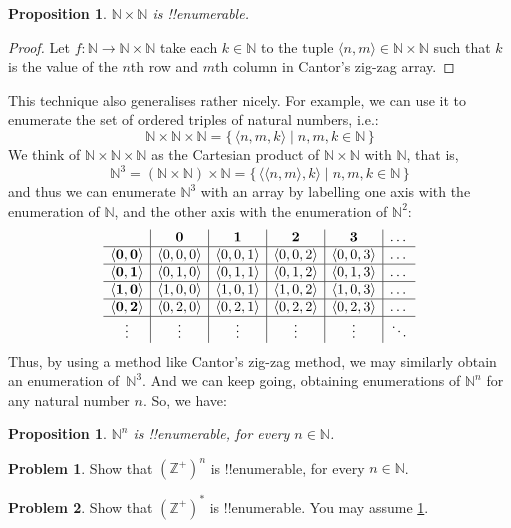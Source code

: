 \documentclass[10pt,a4paper]{article}
\theoremstyle{plain}
\newtheorem{prop}[thm]{Proposition}
\theoremstyle{definition}
\newtheorem{prob}{Problem}[section]
\theoremstyle{remark}
\newenvironment{explain}{}{}
\newcommand*{\ollabel}[1]{\label{#1}}
\providecommand{\tuple}[1]{\langle #1 \rangle}
\providecommand{\Nat}{\ensuremath{\mathbb{N}}}
\providecommand{\PosInt}{\mathbb{Z}^{+}}
\providecommand{\Setabs}[2]{\{\, #1 \mid #2 \,\}}
\providecommand{\cref}[1]{\ref{#1}}
\begin{document}
\begin{prop}\ollabel{natsquaredenumerable}
$\Nat \times \Nat$ is !!{enumerable}.
\end{prop}

\begin{proof}
Let $f \colon \Nat \to \Nat\times\Nat$ take each $k \in \Nat$ to the
tuple $\tuple{n,m} \in \Nat \times \Nat$ such that $k$ is the value of
the $n$th row and $m$th column in Cantor's zig-zag array. 
\end{proof}

\begin{explain}
This technique also generalises rather nicely. For example, we can use
it to enumerate the set of ordered triples of natural numbers, i.e.:
\[
\Nat \times \Nat \times \Nat = \Setabs{\tuple{n,m,k}}{n,m,k \in \Nat}
\]
We think of $\Nat \times \Nat \times \Nat$ as the Cartesian
product of $\Nat \times \Nat$ with $\Nat$, that is,
\[
\Nat^3 = (\Nat \times \Nat) \times \Nat =
\Setabs{\tuple{\tuple{n,m},k}}{n, m, k
  \in \Nat }
\]
and thus we can enumerate $\Nat^3$ with an array by labelling one
axis with the enumeration of $\Nat$, and the other axis with the
enumeration of $\Nat^2$:
\[
\begin{array}{ c | c | c | c | c | c}
& \mathbf 0 & \mathbf 1 & \mathbf 2 & \mathbf 3 & \dots \\
\hline
\mathbf{\tuple{0,0}} & \tuple{0,0,0} & \tuple{0,0,1} & \tuple{0,0,2} & \tuple{0,0,3} & \dots \\
\hline
\mathbf{\tuple{0,1}} & \tuple{0,1,0} & \tuple{0,1,1} & \tuple{0,1,2} & \tuple{0,1,3} & \dots \\
\hline
\mathbf{\tuple{1,0}} & \tuple{1,0,0} & \tuple{1,0,1} & \tuple{1,0,2} & \tuple{1,0,3} & \dots \\
\hline
\mathbf{\tuple{0,2}} & \tuple{0,2,0} & \tuple{0,2,1} & \tuple{0,2,2} & \tuple{0,2,3} & \dots\\
\hline
\vdots & \vdots & \vdots & \vdots & \vdots & \ddots \\
\end{array}
\]
Thus, by using a method like Cantor's zig-zag method, we may similarly
obtain an enumeration of~$\Nat^3$. And we can keep going, obtaining
enumerations of $\Nat^n$ for any natural number $n$. So, we have:
\end{explain}

\begin{prop}
$\Nat^n$ is !!{enumerable}, for every $n \in \Nat$.
\end{prop}

\begin{prob}\label{sfr:siz:zigzag:prob:posint-n}
Show that $(\PosInt)^n$ is !!{enumerable}, for every $n \in \Nat$.
\end{prob}

\begin{prob}\label{sfr:siz:zigzag:prob:posint-star}
  Show that $(\PosInt)^*$ is !!{enumerable}. You may assume \cref{sfr:siz:zigzag:prob:posint-n}.
\end{prob}
\end{document}
